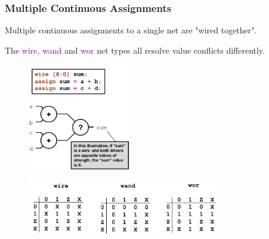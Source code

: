 \documentclass[t, notes, xcolor=table]{beamer}
\begin{document}
\begin{frame}
\frametitle{Multiple Continuous Assignments}
\scriptsize{
\begin{multicols}{2}
Multiple continuous assignments to a single net are "wired together".
\newline

The \textcolor{purple}{wire}, \textcolor{purple}{wand} and \textcolor{purple}{wor} net types all resolve value conflicts differently.
\vfill
\columnbreak
\begin{figure}
    \includegraphics[width=0.4\textwidth]{img/08_cont_mult.png}
\end{figure}
\end{multicols}
}
\begin{figure}
    \includegraphics[width=0.75\textwidth]{img/08_cont_mult_table.png}
\end{figure}
\end{frame}
\end{document}
